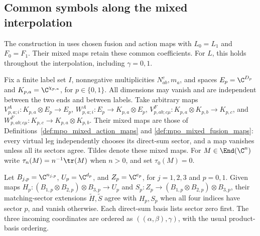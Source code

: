
\subsection{Common symbols along the mixed interpolation}
\label{sec:mpo_mixed_symbols}

The construction in \cite[Section~5]{GarreRubio2023MPOSym} uses chosen
fusion and action maps with $L_0=L_1$ and $F_0=F_1$. Their mixed maps
retain these common coefficients. For $L$, this holds throughout the
interpolation, including $\gamma=0,1$.

Fix a finite label set $I$, nonnegative multiplicities $N_{ab}^c,m_a$,
and spaces $E_p=\C^{D_p}$ and $K_{p,a}=\C^{\chi_{p,a}}$, for
$p\in\{0,1\}$. All dimensions may vanish and are independent between
the two ends and between labels. Take arbitrary maps
$V^A_{p,a;i}:K_{p,a}\otimes E_p\to E_p$,
$W^A_{p,a;i}:E_p\to K_{p,a}\otimes E_p$,
$V^F_{p,ab;c\mu}:K_{p,a}\otimes K_{p,b}\to K_{p,c}$, and
$W^F_{p,ab;c\mu}:K_{p,c}\to K_{p,a}\otimes K_{p,b}$.
Their mixed maps are those of
Definitions~\ref{def:mpo_mixed_action_maps} and
\ref{def:mpo_mixed_fusion_maps}: every virtual leg independently
chooses its direct-sum sector, and a map vanishes unless all its
sectors agree. Tildes denote these mixed maps.
For $M\in\End(\C^n)$ write $\tau_n(M)=n^{-1}\tr(M)$ when $n>0$,
and set $\tau_0(M)=0$.

\begin{definition}
    \label{def:mpo_mixed_triple_maps}
    \leanok
    Let $B_{j,p}=\C^{n_{j,p}}$, $U_p=\C^{d_p}$, and
    $Z_p=\C^{e_p}$, for $j=1,2,3$ and $p=0,1$. Given maps
    $H_p:(B_{1,p}\otimes B_{2,p})\otimes B_{3,p}\to U_p$ and
    $S_p:Z_p\to(B_{1,p}\otimes B_{2,p})\otimes B_{3,p}$,
    their matching-sector extensions $\widetilde H,\widetilde S$
    agree with $H_p,S_p$ when all four indices have sector $p$,
    and vanish otherwise. Each direct-sum basis lists sector zero
    first. The three incoming coordinates are ordered as
    $((\alpha,\beta),\gamma)$, with the usual product-basis ordering.
\end{definition}

